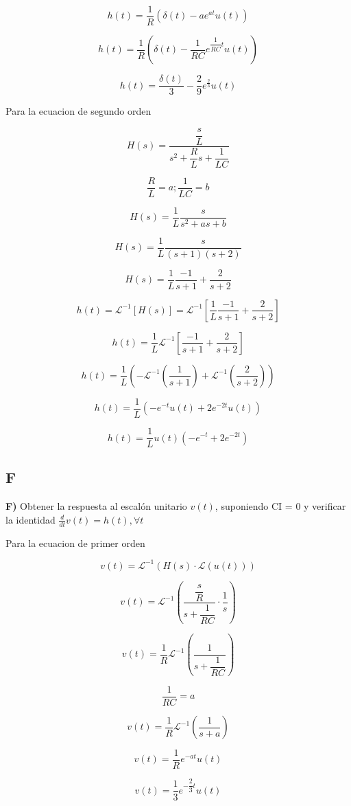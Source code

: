 $$h(t) = \dfrac {1}{R} (\delta (t) - a e^{at} u(t))$$

$$h(t) = \dfrac {1}{R} (\delta (t) - \dfrac{1}{RC} e^{\dfrac{1}{RC} t} u(t))$$

$$h(t) = \dfrac{\delta (t)}{3} - \dfrac{2}{9} e^{\frac{2}{3}} u(t)$$

Para la ecuacion de segundo orden

$$H(s) = \dfrac{\dfrac{s}{L}}{s^2 + \dfrac{R}{L} s + \dfrac{1}{LC}}$$

$$\dfrac{R}{L} = a; \dfrac{1}{LC} = b$$

$$H(s) = \dfrac{1}{L} \dfrac{s}{s^2 + a s + b}$$

$$H(s) = \dfrac{1}{L} \dfrac{s}{(s + 1) (s + 2)}$$

$$H(s) = \dfrac{1}{L} \frac{-1}{s + 1} + \frac{2}{s + 2} $$

$$h(t) = \mathscr{L}^{-1} [H(s)] = \mathscr{L}^{-1} [\frac{1}{L} \frac{-1}{s + 1} + \frac{2}{s + 2}]$$

$$h(t) = \frac{1}{L} \mathscr{L}^{-1} [\frac{-1}{s + 1} + \frac{2}{s + 2}]$$

$$h(t) = \frac{1}{L} (-\mathscr{L}^{-1} (\frac{1}{s + 1}) + \mathscr{L}^{-1} (\frac{2}{s + 2}))$$

$$h(t) = \frac{1}{L} (-e^{-t} u(t) + 2 e^{-2t} u(t))$$

$$h(t) = \frac{1}{L} u(t) (-e^{-t} + 2 e^{-2t})$$

\subsection{F}

\textbf{F)} Obtener la respuesta al escalón unitario $v(t)$, suponiendo CI = 0 y verificar la identidad $\frac{d}{dt} v(t) = h(t), \forall t$

Para la ecuacion de primer orden

$$v(t) = \mathscr{L}^{-1} (H(s) \cdot \mathscr{L} (u(t)))$$

$$v(t) = \mathscr{L}^{-1} (\dfrac{\dfrac{s}{R}}{s + \dfrac{1}{RC}} \cdot \dfrac{1}{s})$$

$$v(t) = \dfrac{1}{R} \mathscr{L}^{-1} (\dfrac{1}{s + \dfrac{1}{RC}})$$

$$\dfrac{1}{RC} = a $$

$$v(t) = \dfrac{1}{R} \mathscr{L}^{-1} (\dfrac{1}{s + a}) $$

$$v(t) = \dfrac{1}{R} e^{-at} u(t) $$

$$v(t) = \dfrac{1}{3} e^{-\dfrac{2}{3}t} u(t)$$

